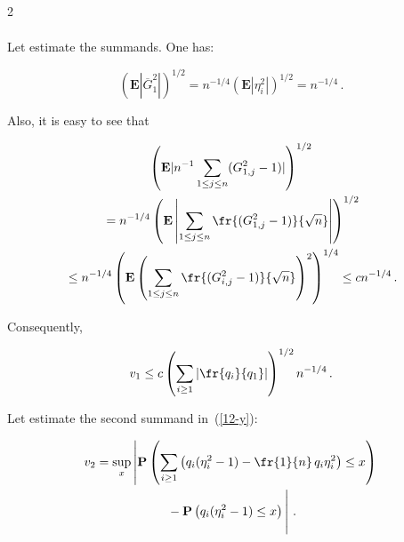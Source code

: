 \begin{multicols}{2}
\begin{multline*}
    \end{multline*}

    Let estimate the summands. One has:

    $$

    \left(\mathbf{E}|  \overline{G}_1^{2}|\right)^{{1}/{2}}=n^{-1/4}\left(\mathbf{E}|

    \eta_i^{2}|\right)^{{1}/{2}}=n^{-1/4}\,.

    $$

    Also, it is easy to see that

    \begin{multline*}

    \left(\mathbf{E}|n^{-1}\sum\limits_{1\leq j\leq

    n}(G_{1,j}^{2}-1)|\right)^{{1}/{2}}\\

    {}=

    n^{-1/4}\left(\mathbf{E}\left\vert\sum\limits_{1\leq j\leq n}

    \fr{(G_{1,j}^{2}-1)}{\sqrt{n}}\right\vert\right)^{{1}/{2}}\\

   {}\leq        n^{-1/4}\left(\mathbf{E}\left(\sum\limits_{1\leq j\leq

    n}\fr{(G_{i,j}^{2}-1)}{\sqrt{n}}\right)^{2}\right)^{{1}/{4}}\leq cn^{-1/4}\,.

    \end{multline*}

    Consequently,

    $$

    v_1\leq c\left(\sum\limits_{i\geq 1}\left\vert\fr{q_i}{q_1}\right\vert\right)^{1/2}n^{-1/4}\,.

    $$

    Let estimate the second summand in~(\ref{12-y}):

    \begin{multline*}

    v_2=\sup\limits_{x}\left\vert\mathbf{P}\left(\sum\limits_{i\geq 1}\left(q_i(\eta_i^{2}-1)-

    \fr{1}{n}\,q_i\eta_i^{2}\right)\leq x\right)\right.\\

\left.    {}-

    \mathbf{P}\left(q_i(\eta_i^{2}-1)\leq

    x\right)

    \vphantom{\fr{1}{n}\sum\limits_{i\geq 1}}\right\vert\,.

    \end{multline*}


\end{multicols}
